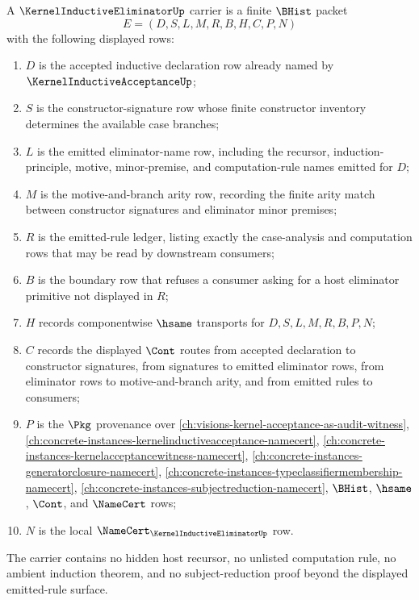 \begin{definition}
\label{def:kernel-inductive-eliminator-carrier}
A $\KernelInductiveEliminatorUp$ carrier is a finite $\BHist$ packet
$$
E=(D,S,L,M,R,B,H,C,P,N)
$$
with the following displayed rows:
\begin{enumerate}
\item $D$ is the accepted inductive declaration row already named by $\KernelInductiveAcceptanceUp$;
\item $S$ is the constructor-signature row whose finite constructor inventory determines the available case branches;
\item $L$ is the emitted eliminator-name row, including the recursor, induction-principle, motive, minor-premise, and computation-rule names emitted for $D$;
\item $M$ is the motive-and-branch arity row, recording the finite arity match between constructor signatures and eliminator minor premises;
\item $R$ is the emitted-rule ledger, listing exactly the case-analysis and computation rows that may be read by downstream consumers;
\item $B$ is the boundary row that refuses a consumer asking for a host eliminator primitive not displayed in $R$;
\item $H$ records componentwise $\hsame$ transports for $D,S,L,M,R,B,P,N$;
\item $C$ records the displayed $\Cont$ routes from accepted declaration to constructor signatures, from signatures to emitted eliminator rows, from eliminator rows to motive-and-branch arity, and from emitted rules to consumers;
\item $P$ is the $\Pkg$ provenance over \autoref{ch:visions-kernel-acceptance-as-audit-witness}, \autoref{ch:concrete-instances-kernelinductiveacceptance-namecert}, \autoref{ch:concrete-instances-kernelacceptancewitness-namecert}, \autoref{ch:concrete-instances-generatorclosure-namecert}, \autoref{ch:concrete-instances-typeclassifiermembership-namecert}, \autoref{ch:concrete-instances-subjectreduction-namecert}, $\BHist$, $\hsame$, $\Cont$, and $\NameCert$ rows;
\item $N$ is the local $\NameCert_{\KernelInductiveEliminatorUp}$ row.
\end{enumerate}
The carrier contains no hidden host recursor, no unlisted computation rule, no ambient induction theorem, and no subject-reduction proof beyond the displayed emitted-rule surface.
\end{definition}

